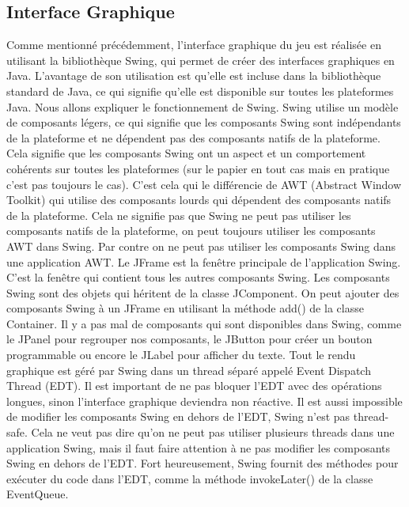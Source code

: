 \documentclass{article}
\begin{document}
    \subsection{Interface Graphique}\label{subsec:interface-graphique}

    Comme mentionné précédemment, l'interface graphique du jeu est réalisée en utilisant la bibliothèque Swing, qui permet de créer des interfaces graphiques en Java.
    L'avantage de son utilisation est qu'elle est incluse dans la bibliothèque standard de Java, ce qui signifie qu'elle est disponible sur toutes les plateformes Java.
    Nous allons expliquer le fonctionnement de Swing.
    \newline
    Swing utilise un modèle de composants légers, ce qui signifie que les composants Swing sont indépendants de la plateforme et ne dépendent pas des composants natifs de la plateforme.
    Cela signifie que les composants Swing ont un aspect et un comportement cohérents sur toutes les plateformes (sur le papier en tout cas mais en pratique c'est pas toujours le cas).
    C'est cela qui le différencie de AWT (Abstract Window Toolkit) qui utilise des composants lourds qui dépendent des composants natifs de la plateforme.
    Cela ne signifie pas que Swing ne peut pas utiliser les composants natifs de la plateforme, on peut toujours utiliser les composants AWT dans Swing.
    Par contre on ne peut pas utiliser les composants Swing dans une application AWT.
    Le JFrame est la fenêtre principale de l'application Swing. C'est la fenêtre qui contient tous les autres composants Swing.
    Les composants Swing sont des objets qui héritent de la classe JComponent.
    On peut ajouter des composants Swing à un JFrame en utilisant la méthode add() de la classe Container.
    Il y a pas mal de composants qui sont disponibles dans Swing, comme le JPanel pour regrouper nos composants, le JButton pour créer un bouton programmable ou encore le JLabel pour afficher du texte.
    \newline
    Tout le rendu graphique est géré par Swing dans un thread séparé appelé Event Dispatch Thread (EDT).
    Il est important de ne pas bloquer l'EDT avec des opérations longues, sinon l'interface graphique deviendra non réactive.
    Il est aussi impossible de modifier les composants Swing en dehors de l'EDT, Swing n'est pas thread-safe.
    Cela ne veut pas dire qu'on ne peut pas utiliser plusieurs threads dans une application Swing, mais il faut faire attention à ne pas modifier les composants Swing en dehors de l'EDT.
    Fort heureusement, Swing fournit des méthodes pour exécuter du code dans l'EDT, comme la méthode invokeLater() de la classe EventQueue.
\end{document}
